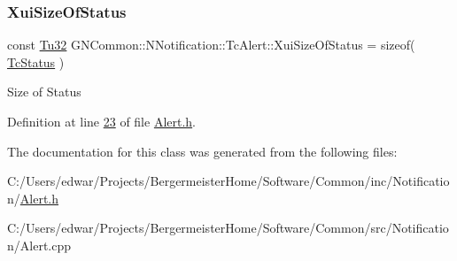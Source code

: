\subsubsection{\texorpdfstring{Xui\+Size\+Of\+Status}{XuiSizeOfStatus}}
{\footnotesize\ttfamily const \mbox{\hyperlink{namespace_g_n_common_a941b527ef318f318aed7903dc832b7e4}{Tu32}} G\+N\+Common\+::\+N\+Notification\+::\+Tc\+Alert\+::\+Xui\+Size\+Of\+Status = sizeof( \mbox{\hyperlink{class_g_n_common_1_1_n_notification_1_1_tc_status}{Tc\+Status}} )\hspace{0.3cm}{\ttfamily [static]}}

Size of Status 

Definition at line \mbox{\hyperlink{_alert_8h_source_l00023}{23}} of file \mbox{\hyperlink{_alert_8h_source}{Alert.\+h}}.



The documentation for this class was generated from the following files\+:\begin{DoxyCompactItemize}
\item 
C\+:/\+Users/edwar/\+Projects/\+Bergermeister\+Home/\+Software/\+Common/inc/\+Notification/\mbox{\hyperlink{_alert_8h}{Alert.\+h}}\item 
C\+:/\+Users/edwar/\+Projects/\+Bergermeister\+Home/\+Software/\+Common/src/\+Notification/Alert.\+cpp\end{DoxyCompactItemize}

